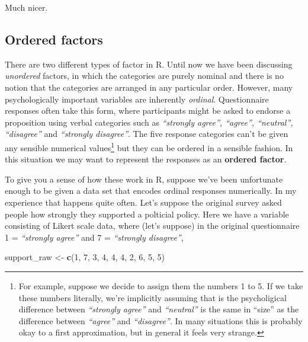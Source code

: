 \documentclass[]{book}
\newenvironment{Shaded}{\begin{snugshade}}{\end{snugshade}}
\newcommand{\DecValTok}[1]{\textcolor[rgb]{0.00,0.00,0.81}{#1}}
\newcommand{\KeywordTok}[1]{\textcolor[rgb]{0.13,0.29,0.53}{\textbf{#1}}}
\newcommand{\NormalTok}[1]{#1}
\newcommand{\StringTok}[1]{\textcolor[rgb]{0.31,0.60,0.02}{#1}}
\let\rmarkdownfootnote\footnote%
\def\footnote{\protect\rmarkdownfootnote}
\begin{document}
Much nicer.

\hypertarget{ordered-factors}{%
\subsection{Ordered factors}\label{ordered-factors}}

There are two different types of factor in R. Until now we have been discussing \emph{unordered} factors, in which the categories are purely nominal and there is no notion that the categories are arranged in any particular order. However, many psychologically important variables are inherently \emph{ordinal}. Questionnaire responses often take this form, where participants might be asked to endorse a proposition using verbal categories such as \emph{``strongly agree'', ``agree'', ``neutral'', ``disagree''} and \emph{``strongly disagree''}. The five response categories can't be given any sensible numerical values\footnote{For example, suppose we decide to assign them the numbers 1 to 5. If we take these numbers literally, we're implicitly assuming that is the psycholigical difference between \emph{``strongly agree''} and \emph{``neutral''} is the same in ``size'' as the difference between \emph{``agree''} and \emph{``disagree''}. In many situations this is probably okay to a first approximation, but in general it feels very strange.} but they can be ordered in a sensible fashion. In this situation we may want to represent the responses as an \textbf{ordered factor}.

To give you a sense of how these work in R, suppose we've been unfortunate enough to be given a data set that encodes ordinal responses numerically. In my experience that happens quite often. Let's suppose the original survey asked people how strongly they supported a polticial policy. Here we have a variable consisting of Likert scale data, where (let's suppose) in the original questionnaire 1 = \emph{``strongly agree''} and 7 = \emph{``strongly disagree''},

\begin{Shaded}
\begin{Highlighting}[]
\NormalTok{support_raw <-}\StringTok{ }\KeywordTok{c}\NormalTok{(}\DecValTok{1}\NormalTok{, }\DecValTok{7}\NormalTok{, }\DecValTok{3}\NormalTok{, }\DecValTok{4}\NormalTok{, }\DecValTok{4}\NormalTok{, }\DecValTok{4}\NormalTok{, }\DecValTok{2}\NormalTok{, }\DecValTok{6}\NormalTok{, }\DecValTok{5}\NormalTok{, }\DecValTok{5}\NormalTok{)}
\end{Highlighting}
\end{Shaded}
\end{document}

